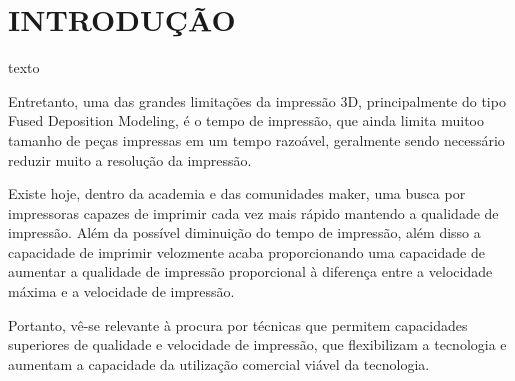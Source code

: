 \chapter{INTRODUÇÃO}

texto

Entretanto, uma das grandes limitações da impressão 3D, principalmente
do tipo Fused Deposition Modeling, é o tempo de impressão, que ainda 
limita muitoo tamanho de peças impressas em um tempo razoável, 
geralmente sendo necessário reduzir muito a resolução da impressão.

Existe hoje, dentro da academia e das comunidades maker, uma busca por 
impressoras capazes de imprimir cada vez mais rápido mantendo a qualidade 
de impressão. Além  da possível diminuição do tempo de impressão, 
além disso a capacidade de imprimir velozmente acaba proporcionando 
uma capacidade de aumentar a qualidade de impressão proporcional à diferença
entre a velocidade máxima e a velocidade de impressão.

Portanto, vê-se  relevante à procura por técnicas que permitem capacidades 
superiores de qualidade e velocidade de impressão, que flexibilizam a 
tecnologia e aumentam a capacidade da utilização comercial viável da tecnologia.
